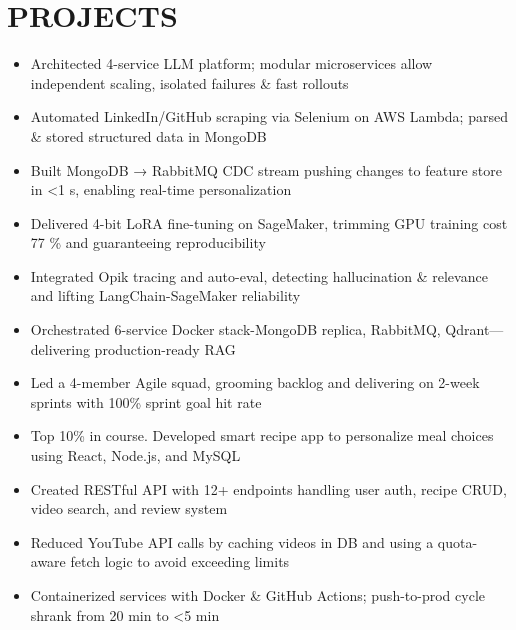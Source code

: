 \documentclass{resume}
\begin{document}
\section[PROJECTS]{PROJECTS}






 {}


\begin{itemize}
  \item Architected 4-service LLM platform; modular microservices allow independent scaling, isolated failures \& fast rollouts
  \item Automated LinkedIn/GitHub scraping via Selenium on AWS Lambda; parsed \& stored structured data in MongoDB
  \item Built MongoDB → RabbitMQ CDC stream pushing changes to feature store in <1 s, enabling real-time personalization

  \item Delivered 4-bit LoRA fine-tuning on SageMaker, trimming GPU training cost 77 \% and guaranteeing reproducibility


  \item Integrated Opik tracing and auto-eval, detecting hallucination \& relevance and lifting LangChain-SageMaker reliability
  \item Orchestrated 6-service Docker stack-MongoDB replica, RabbitMQ, Qdrant—delivering production-ready RAG


\end{itemize}



 {}

\begin{itemize}
    \item Led a 4-member Agile squad, grooming backlog and delivering on 2-week sprints with 100\% sprint goal hit rate
	\item Top 10\% in course. Developed smart recipe app to personalize meal choices using React, Node.js, and MySQL %
	\item Created RESTful API with 12+ endpoints handling user auth, recipe CRUD, video search, and review system
  \item Reduced YouTube API calls by caching videos in DB and using a quota-aware fetch logic to avoid exceeding limits
  \item Containerized services with Docker \& GitHub Actions; push-to-prod cycle shrank from 20 min to <5 min


\end{itemize}
\end{document}
